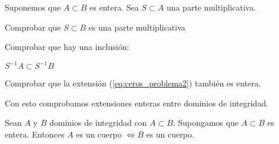 	\begin{problem}
		Suponemos que $A \subset B$ es entera.
		Sea $S \subset A$ una parte multiplicativa.

		\ppart Comprobar que $S \subset B$ es una parte multiplicativa

		\ppart Comprobar que hay una inclusión:

			\(S^{-1} A \subset S^{-1}B \label{eq:ceros_problema2} \)

		\ppart Comprobar que la extensión (\ref{eq:ceros_problema2}) también es entera.

		\solution
	\end{problem}

	Con esto comprobamos extensiones enteras entre dominios de integridad.

	\begin{theorem}
		Sean $A$ y $B$ dominios de integridad con $A \subset B$. Supongamos que $A \subset B$ es entera. Entonces $A$ es un cuerpo $\Leftrightarrow B$ es un cuerpo.
	\end{theorem}

